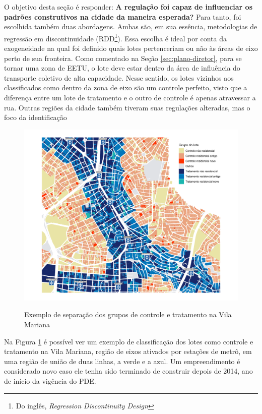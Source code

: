 O objetivo desta seção é responder: \textbf{A regulação foi capaz de influenciar os padrões construtivos na cidade da maneira esperada?} Para tanto, foi escolhida também duas abordagens. Ambas são, em sua essência, metodologias de regressão em discontinuidade (RDD\footnote{Do inglês, \textit{Regression Discontinuity Design}}). Essa escolha é ideal por conta da exogeneidade na qual foi definido quais lotes pertenceriam ou não às áreas de eixo perto de sua fronteira. Como comentado na Seção \ref{sec:plano-diretor}, para se tornar uma zona de EETU, o lote deve estar dentro da área de influência do transporte coletivo de alta capacidade. Nesse sentido, os lotes vizinhos aos classificados como dentro da zona de eixo são um controle perfeito, visto que a diferença entre um lote de tratamento e o outro de controle é apenas atravessar a rua. Outras regiões da cidade também tiveram suas regulações alteradas, mas o foco da identificação 

\begin{figure}[h]
    \centering
    \caption{Exemplo de separação dos grupos de controle e tratamento na Vila Mariana}
    \includegraphics[width = .9\textwidth]{figuras/mapa-lotes-metro.pdf}
    \label{fig:mapaRDD}
\end{figure}

Na Figura \ref{fig:mapaRDD} é possível ver um exemplo de classificação dos lotes como controle e tratamento na Vila Mariana, região de eixos ativados por estações de metrô, em uma região de união de duas linhas, a verde e a azul. Um empreendimento é considerado novo caso ele tenha sido terminado de construir depois de 2014, ano de início da vigência do PDE. 

